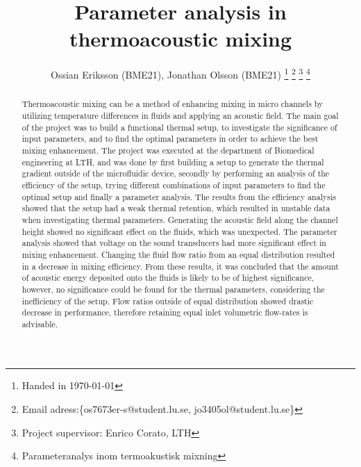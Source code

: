 \documentclass[twoside,twocolumn,9pt,a4paper]{IEEEtran}
\begin{document}
\title{Parameter analysis in thermoacoustic mixing}
\author{
Ossian Eriksson (BME21), Jonathan Olsson (BME21)
\thanks{Handed in \today}
\thanks{Email adress:\{os7673er-s@student.lu.se, jo3405ol@student.lu.se\}}
\thanks{Project supervisor: Enrico Corato, LTH}
\thanks{Parameteranalys inom termoakustisk mixning} %
}
\maketitle


\begin{abstract}
Thermoacoustic mixing can be a method of enhancing mixing in micro channels by utilizing temperature differences in fluids and applying an acoustic field. The main goal of the project was to build a functional thermal setup, to investigate the significance of input parameters, and to find the optimal parameters in order to achieve the best mixing enhancement. The project was executed at the department of Biomedical engineering at LTH, and was done by first building a setup to generate the thermal gradient outside of the microfluidic device, secondly by performing an analysis of the efficiency of the setup, trying different combinations of input parameters to find the optimal setup and finally a parameter analysis. The results from the efficiency analysis showed that the setup had a weak thermal retention, which resulted in unstable data when investigating thermal parameters. Generating the acoustic field along the channel height showed no significant effect on the fluids, which was unexpected. The parameter analysis showed that voltage on the sound transducers had more significant effect in mixing enhancement. Changing the fluid flow ratio from an equal distribution resulted in a decrease in mixing efficiency. From these results, it was concluded that the amount of acoustic energy deposited onto the fluids is likely to be of highest significance, however, no significance could be found for the thermal parameters, considering the inefficiency of the setup. Flow ratios outside of equal distribution showed drastic decrease in performance, therefore retaining equal inlet volumetric flow-rates is advisable.
\end{abstract}

\end{document}

